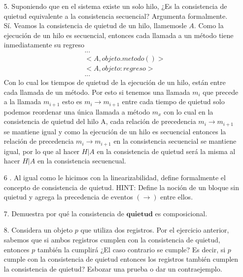 \documentclass[12pt, letterpaper]{article}
\begin{document}
\begin{itemize}
\item[5. ] Suponiendo que en el sistema existe un solo hilo, ¿Es la consistencia de quietud
equivalente a la consistencia secuencial? Argumenta formalmente.\\
Sí. Veamos la consistencia de quietud de un hilo, llamemosle $A$. Como la ejecución de un hilo es secuencial, entonces cada llamada a un método tiene inmediatamente su regreso
\begin{equation*}
\begin{split}
&...\\
&<A, objeto.metodo()> \\
&<A, objeto:regreso>\\
&...
\end{split}
\end{equation*}  
Con lo cual los tiempos de quietud de la ejecución de un hilo, están entre cada llamada de un método. Por esto si tenemos una llamada $m_i$ que precede a la llamada $m_{i+1}$ esto es $m_i \rightarrow m_{i+1}$ entre cada tiempo de quietud solo podemos reordenar una única llamada a método $m_x$ con lo cual en la consistencia de quietud del hilo A, cada relación de precedencia $m_i \rightarrow m_{i+1}$ se mantiene igual y como la ejecución de un hilo es secuencial entonces la relación de precedencia $m_i \rightarrow m_{i+1}$ en la consistencia secuencial se mantiene igual, por lo que al hacer $H|A$ en la consistencia de quietud será la misma al hacer $H|A$ en la consistencia secuencual.

\item[6 .] Al igual como le hicimos con la linearizabilidad, define formalmente el concepto
de consistencia de quietud. HINT: Define la noción de un bloque sin quietud y agrega la precedencia de eventos $(\rightarrow)$ entre ellos.

\item[7. ]Demuestra por qué la consistencia de $\textbf{quietud}$ es composicional.

\item[8. ] Considera un objeto $p$ que utiliza dos registros. Por el ejercicio anterior, sabemos que si ambos registros cumplen con la consistencia de quietud, entonces $p$ también la cumplirá ¿El caso contrario se cumple? Es decir, si $p$ cumple con la consistencia de quietud entonces los registros también cumplen la consistencia de quietud? Esbozar una prueba o dar un contraejemplo.


\end{itemize}
\end{document}
